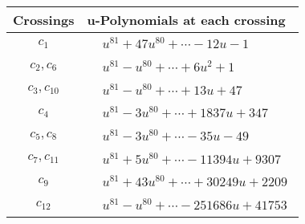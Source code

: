\documentclass[1p]{elsarticle_modified}
\theoremstyle{definition}
\begin{document}
\begin{tabular}{m{50pt}|m{274pt}}
Crossings & \hspace{64pt}u-Polynomials at each crossing \\
\hline $$\begin{aligned}c_{1}\end{aligned}$$&$\begin{aligned}
&u^{81}+47 u^{80}+\cdots-12 u-1
\end{aligned}$\\
\hline $$\begin{aligned}c_{2},c_{6}\end{aligned}$$&$\begin{aligned}
&u^{81}- u^{80}+\cdots+6 u^2+1
\end{aligned}$\\
\hline $$\begin{aligned}c_{3},c_{10}\end{aligned}$$&$\begin{aligned}
&u^{81}- u^{80}+\cdots+13 u+47
\end{aligned}$\\
\hline $$\begin{aligned}c_{4}\end{aligned}$$&$\begin{aligned}
&u^{81}-3 u^{80}+\cdots+1837 u+347
\end{aligned}$\\
\hline $$\begin{aligned}c_{5},c_{8}\end{aligned}$$&$\begin{aligned}
&u^{81}-3 u^{80}+\cdots-35 u-49
\end{aligned}$\\
\hline $$\begin{aligned}c_{7},c_{11}\end{aligned}$$&$\begin{aligned}
&u^{81}+5 u^{80}+\cdots-11394 u+9307
\end{aligned}$\\
\hline $$\begin{aligned}c_{9}\end{aligned}$$&$\begin{aligned}
&u^{81}+43 u^{80}+\cdots+30249 u+2209
\end{aligned}$\\
\hline $$\begin{aligned}c_{12}\end{aligned}$$&$\begin{aligned}
&u^{81}- u^{80}+\cdots-251686 u+41753
\end{aligned}$\\
\hline
\end{tabular}\\~\\
\end{document}
